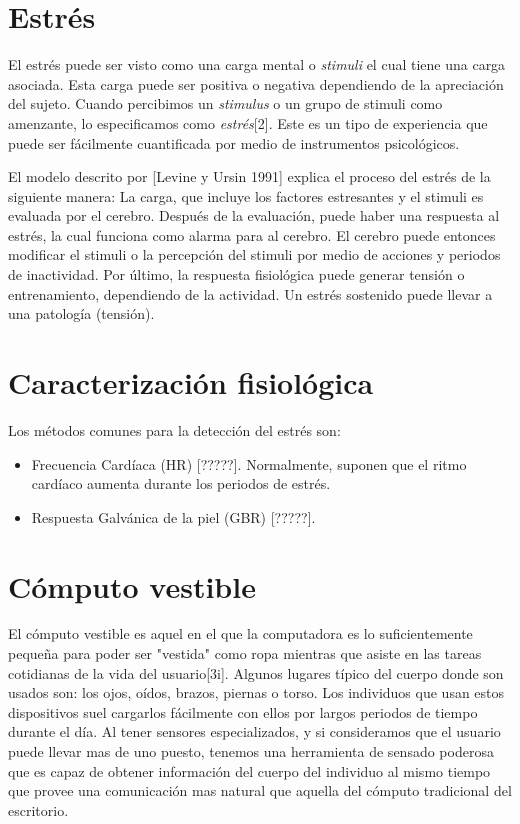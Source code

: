 \documentclass[letterpaper,12pt]{cicese}
\begin{document}
			\section{Estr\'es}
				El estr\'es puede ser visto como una carga mental o \emph{stimuli} el cual tiene una carga asociada. Esta carga puede ser positiva o negativa dependiendo
				de la apreciaci\'on del sujeto. Cuando percibimos un \emph{stimulus} o un grupo de {stimuli} como amenzante, lo especificamos como \emph{estr\'es}[2].
				Este es un tipo de experiencia que puede ser f\'acilmente cuantificada por medio de instrumentos psicol\'ogicos.
				
				El modelo descrito por [Levine y Ursin 1991] explica el proceso del estr\'es de la siguiente manera: La carga, que incluye los factores estresantes y el
				stimuli es evaluada por el cerebro. Despu\'es de la evaluaci\'on, puede haber una respuesta al estr\'es, la cual funciona como alarma para al cerebro.
				El cerebro puede entonces modificar el stimuli o la percepci\'on del stimuli por medio de acciones y periodos de inactividad. Por \'ultimo, la respuesta
				fisiol\'ogica puede generar tensi\'on  o entrenamiento, dependiendo de la actividad. Un estr\'es sostenido puede llevar a una patolog\'ia (tensi\'on).
			\section{Caracterizaci\'on fisiol\'ogica}
				Los m\'etodos comunes para la detecci\'on del estr\'es son: 
					\begin{itemize}
						\item Frecuencia Card\'iaca (HR) [?????]. Normalmente, suponen que el ritmo card\'iaco aumenta durante los periodos de estr\'es. 
						\item Respuesta Galv\'anica de la piel (GBR) [?????]. 
					\end{itemize}
			\section{C\'omputo vestible}
				El c\'omputo vestible es aquel en el que la computadora es lo suficientemente pequeña para poder ser "vestida" como ropa mientras que asiste en las
				tareas cotidianas de la vida del usuario[3i]. Algunos lugares t\'ipico del cuerpo donde son usados son: los ojos, o\'idos, brazos, piernas o torso.
				Los individuos que usan estos dispositivos suel cargarlos f\'acilmente con ellos por largos periodos de tiempo durante el d\'ia. Al tener sensores
				especializados, y si consideramos que el usuario puede llevar mas de uno puesto, tenemos una herramienta de sensado poderosa que es capaz de obtener
				informaci\'on del cuerpo del individuo al mismo tiempo que provee una comunicaci\'on mas natural que aquella del c\'omputo tradicional del escritorio.
\end{document}
